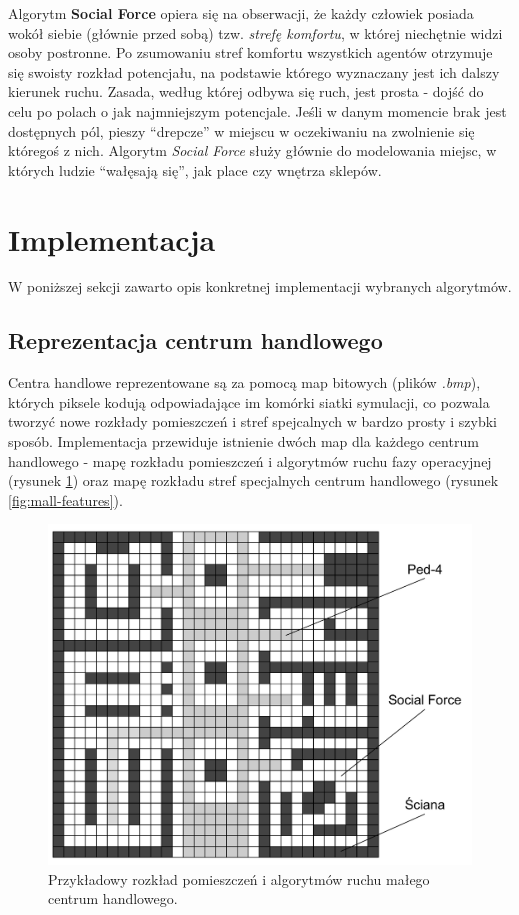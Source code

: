 \documentclass[a4paper, 12pt]{article}
\begin{document}
Algorytm \textbf{Social Force} opiera się na obserwacji, że każdy człowiek posiada wokół siebie (głównie przed sobą) tzw. \textit{strefę komfortu}, w której niechętnie widzi osoby postronne. Po zsumowaniu stref komfortu wszystkich agentów otrzymuje się swoisty rozkład potencjału, na podstawie którego wyznaczany jest ich dalszy kierunek ruchu. Zasada, według której odbywa się ruch, jest prosta - dojść do celu po polach o jak najmniejszym potencjale. Jeśli w danym momencie brak jest dostępnych pól, pieszy ``drepcze'' w miejscu w oczekiwaniu na zwolnienie się któregoś z nich. Algorytm \textit{Social Force} służy głównie do modelowania miejsc, w których ludzie ``wałęsają się'', jak place czy wnętrza sklepów.

\newpage
    \section{Implementacja}
    \label{sec:implementation}

    W poniższej sekcji zawarto opis konkretnej implementacji wybranych algorytmów.

        \subsection{Reprezentacja centrum handlowego}
        \label{sec:mall-impl}

        Centra handlowe reprezentowane są za pomocą map bitowych (plików \emph{.bmp}), których piksele kodują odpowiadające im komórki siatki symulacji, co pozwala tworzyć nowe rozkłady pomieszczeń i stref spejcalnych w bardzo prosty i szybki sposób. Implementacja przewiduje istnienie dwóch map dla każdego centrum handlowego - mapę rozkładu pomieszczeń i algorytmów ruchu fazy operacyjnej (rysunek \ref{fig:mall-layout}) oraz mapę rozkładu stref specjalnych centrum handlowego (rysunek \ref{fig:mall-features}).

        \begin{figure}[H]
            \centering
            \includegraphics[scale=0.3]{./img/MallLayout.pdf}
            \caption{Przykładowy rozkład pomieszczeń i algorytmów ruchu małego centrum handlowego.}
            \label{fig:mall-layout}
        \end{figure}
\end{document}
